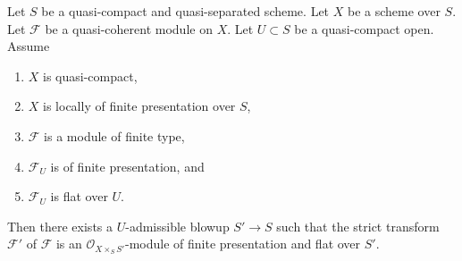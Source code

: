 %
\begin{theorem}
\label{theorem-flatten-module}
Let $S$ be a quasi-compact and quasi-separated scheme.
Let $X$ be a scheme over $S$.
Let $\mathcal{F}$ be a quasi-coherent module on $X$.
Let $U \subset S$ be a quasi-compact open. Assume
\begin{enumerate}
\item $X$ is quasi-compact,
\item $X$ is locally of finite presentation over $S$,
\item $\mathcal{F}$ is a module of finite type,
\item $\mathcal{F}_U$ is of finite presentation, and
\item $\mathcal{F}_U$ is flat over $U$.
\end{enumerate}
Then there exists a $U$-admissible blowup $S' \to S$ such that the
strict transform $\mathcal{F}'$ of $\mathcal{F}$ is an
$\mathcal{O}_{X \times_S S'}$-module of finite presentation and
flat over $S'$.
\end{theorem}

